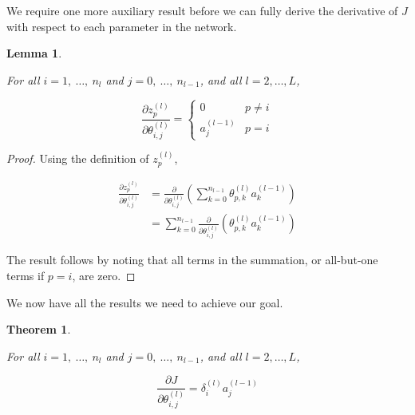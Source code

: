 \documentclass{article}[11pt]
\newtheorem{lemma}{Lemma}
\newtheorem{theorem}{Theorem}
\begin{document}
        We require one more auxiliary result before we can fully derive the derivative of $J$ with respect to each parameter in the network.
        
        
        \begin{lemma} \label{thm:dz_dtheta}
            
            For all $i = 1, \ \ldots, \ n_l$ and $j = 0, \ \ldots, \ n_{l-1}$, and all $l = 2, \ldots, L$,
            
            $$
            \frac{\partial z^{(l)}_p}{\partial \theta^{(l)}_{i,j}} = \begin{cases}
                0 & p \neq i \\
                a^{(l-1)}_j & p = i
            \end{cases}
            $$
            
        \end{lemma}
        
        \begin{proof}
            
            Using the definition of $z^{(l)}_p$,
            
            $$ \begin{aligned}
            \frac{\partial z^{(l)}_p}{\partial \theta^{(l)}_{i,j}}
            &= \frac{\partial}{\partial \theta^{(l)}_{i,j}} \left( \sum_{k=0}^{n_{l-1}} \theta^{(l)}_{p,k} a^{(l-1)}_k \right) \\
            &= \sum_{k=0}^{n_{l-1}} \frac{\partial}{\partial \theta^{(l)}_{i,j}} \left( \theta^{(l)}_{p,k} a^{(l-1)}_k \right)
            \end{aligned} $$
            
            The result follows by noting that all terms in the summation, or all-but-one terms if $p = i$, are zero.
            
        \end{proof}
        
        
        We now have all the results we need to achieve our goal.
        
        
        \begin{theorem} \label{thm:backprop}
            
            For all $i = 1, \ \ldots, \ n_l$ and $j = 0, \ \ldots, \ n_{l-1}$, and all $l = 2, \ldots, L$,
            
            $$
            \frac{\partial J}{\partial \theta^{(l)}_{i,j}} = \delta^{(l)}_i a^{(l-1)}_j
            $$
            
        \end{theorem}
        
\end{document}
